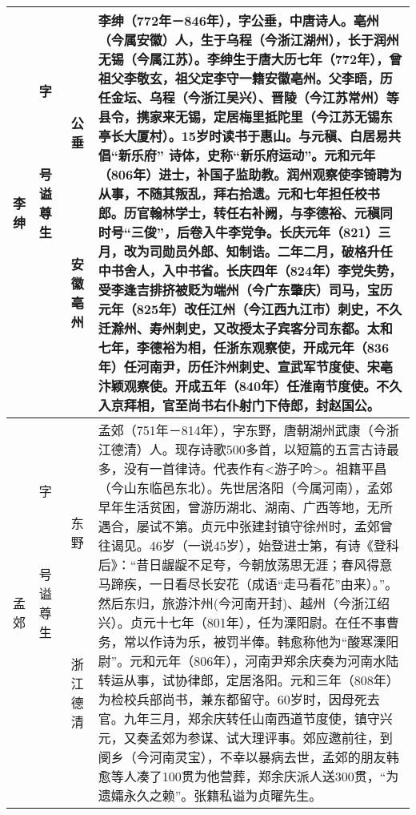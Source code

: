 \begin{longtable}{|>{\centering\namefont\heiti}m{2em}|>{\centering\tiny}m{3.0em}|>{\xzfont\kaiti}m{7.3em}|}
  李绅 & \begin{description}
  \item[字] 公垂
  \item[号] 
  \item[谥] 
  \item[尊] 
  \item[生] 安徽亳州
  \end{description} & 李绅（772年－846年），字公垂，中唐诗人。亳州（今属安徽）人，生于乌程（今浙江湖州），长于润州无锡（今属江苏）。李绅生于唐大历七年（772年），曾祖父李敬玄，祖父定李守一籍安徽亳州。父李晤，历任金坛、乌程（今浙江吴兴）、晋陵（今江苏常州）等县令，携家来无锡，定居梅里抵陀里（今江苏无锡东亭长大厦村）。15岁时读书于惠山。与元稹、白居易共倡“新乐府” 诗体，史称“新乐府运动”。元和元年（806年）进士，补国子监助教。润州观察使李锜聘为从事，不随其叛乱，拜右拾遗。元和七年担任校书郎。历官翰林学士，转任右补阙，与李德裕、元稹同时号“三俊”，后卷入牛李党争。长庆元年（821）三月，改为司勋员外郎、知制诰。二年二月，破格升任中书舍人，入中书省。长庆四年（824年）李党失势，受李逢吉排挤被贬为端州（今广东肇庆）司马，宝历元年（825年）改任江州（今江西九江市）刺史，不久迁滁州、寿州刺史，又改授太子宾客分司东都。太和七年，李德裕为相，任浙东观察使，开成元年（836年）任河南尹，历任汴州刺史、宣武军节度使、宋亳汴颖观察使。开成五年（840年）任淮南节度使。不久入京拜相，官至尚书右仆射门下侍郎，封赵国公。 \tabularnewline\hline
  孟郊 & \begin{description}
  \item[字] 东野
  \item[号] 
  \item[谥] 
  \item[尊] 
  \item[生] 浙江德清
  \end{description} & 孟郊（751年－814年），字东野，唐朝湖州武康（今浙江德清）人。现存诗歌500多首，以短篇的五言古诗最多，没有一首律诗。代表作有<游子吟>。祖籍平昌（今山东临邑东北）。先世居洛阳（今属河南），孟郊早年生活贫困，曾游历湖北、湖南、广西等地，无所遇合，屡试不第。贞元中张建封镇守徐州时，孟郊曾往谒见。46岁（一说45岁），始登进士第，有诗《登科后》：“昔日龌龊不足夸，今朝放荡思无涯；春风得意马蹄疾，一日看尽长安花（成语“走马看花”由来）。”。然后东归，旅游汴州(今河南开封)、越州（今浙江绍兴）。贞元十七年（801年），任为溧阳尉。在任不事曹务，常以作诗为乐，被罚半俸。韩愈称他为“酸寒溧阳尉”。元和元年（806年），河南尹郑余庆奏为河南水陆转运从事，试协律郎，定居洛阳。元和三年（808年）为检校兵部尚书，兼东都留守。60岁时，因母死去官。九年三月，郑余庆转任山南西道节度使，镇守兴元，又奏孟郊为参谋、试大理评事。郊应邀前往，到阌乡（今河南灵宝），不幸以暴病去世，孟郊的朋友韩愈等人凑了100贯为他营葬，郑余庆派人送300贯，“为遗孀永久之赖”。张籍私谥为贞曜先生。 \tabularnewline\hline

\end{longtable}
